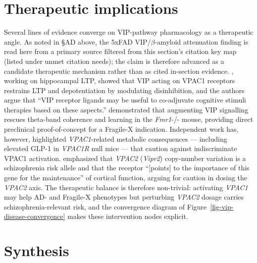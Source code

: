 \documentclass[11pt]{article}
\begin{document}
\section{Therapeutic implications}

Several lines of evidence converge on VIP-pathway pharmacology as a
therapeutic angle. As noted in §AD above, the 5xFAD VIP/$\beta$-amyloid attenuation finding is
read here from a primary source filtered from this section's citation
key map (listed under unmet citation needs); the claim is therefore
advanced as a candidate therapeutic mechanism rather than as cited
in-section evidence. \citet{Aidilcarvalho2022}, working on hippocampal LTP, showed that VIP
acting on VPAC1 receptors restrains LTP and depotentiation by modulating
disinhibition, and the authors argue that ``VIP receptor ligands may be
useful to co-adjuvate cognitive stimuli therapies based on these
aspects.'' \citet{Bhandari2024} demonstrated that augmenting VIP
signalling rescues theta-band coherence and learning in the \textit{Fmr1}-/-
mouse, providing direct preclinical proof-of-concept for a Fragile-X
indication. Independent work has, however, highlighted \textit{VPAC1}-related
metabolic consequences --- including elevated GLP-1 in \textit{VPAC1R} null mice ---
that caution against indiscriminate VPAC1 activation. \citet{Miller2025}
emphasized that \textit{VPAC2} (\textit{Vipr2}) copy-number variation is a
schizophrenia risk allele and that the receptor ``[points] to the
importance of this gene for the maintenance'' of cortical function,
arguing for caution in dosing the \textit{VPAC2} axis. The therapeutic balance
is therefore non-trivial: activating \textit{VPAC1} may help AD- and Fragile-X
phenotypes but perturbing \textit{VPAC2} dosage carries schizophrenia-relevant
risk, and the convergence diagram of Figure~\ref{fig-vip-disease-convergence}
makes these intervention nodes explicit.

\section{Synthesis}
\end{document}
